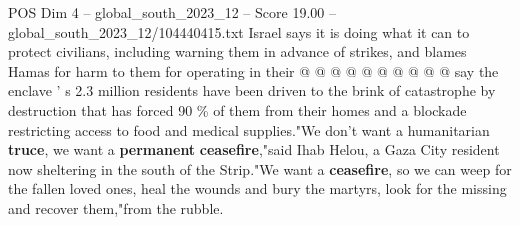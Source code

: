 \begin{textsample}{POS Dim 4 – global\_south\_2023\_12 – Score 19.00 – global\_south\_2023\_12/104440415.txt}
Israel says it is doing what it can to protect civilians, including warning them in advance of strikes, and blames Hamas for harm to them for operating in their @ @ @ @ @ @ @ @ @ @ say the enclave ' s 2.3 million residents have been driven to the brink of catastrophe by destruction that has forced 90 \% of them from their homes and a blockade restricting access to food and medical supplies."We don't want a humanitarian \textbf{truce}, we want a \textbf{permanent} \textbf{ceasefire},"said Ihab Helou, a Gaza City resident now sheltering in the south of the Strip."We want a \textbf{ceasefire}, so we can weep for the fallen loved ones, heal the wounds and bury the martyrs, look for the missing and recover them,"from the rubble.

\end{textsample}
